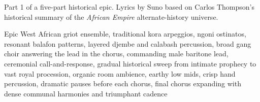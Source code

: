 
\begin{notes}
Part 1 of a five-part historical epic. Lyrics by Suno based on Carlos Thompson's historical summary of the \emph{African Empire} alternate-history universe.
\end{notes}
\begin{style}
Epic West African griot ensemble, traditional kora arpeggios, ngoni ostinatos, resonant balafon patterns, layered djembe and calabash percussion, broad gang choir answering the lead in the chorus, commanding male baritone lead, ceremonial call-and-response, gradual historical sweep from intimate prophecy to vast royal procession, organic room ambience, earthy low mids, crisp hand percussion, dramatic pauses before each chorus, final chorus expanding with dense communal harmonies and triumphant cadence
\end{style}
